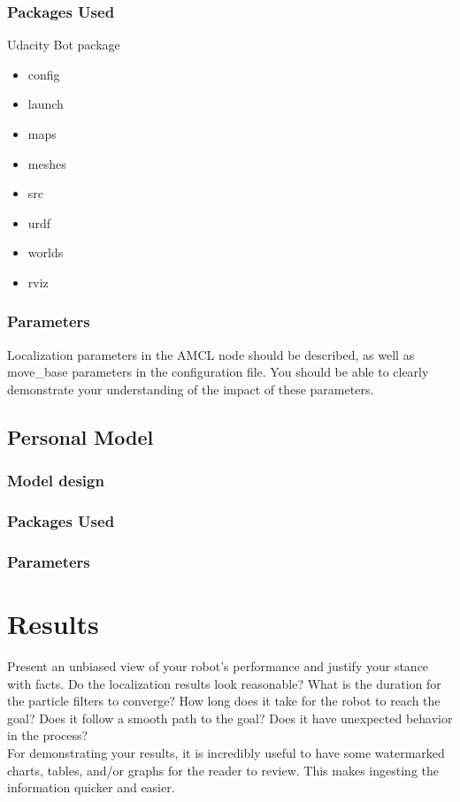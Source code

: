 \documentclass[10pt,journal,compsoc]{IEEEtran}
\begin{document}
\subsubsection{Packages Used}
Udacity Bot package
\begin{itemize}
\item config
\item launch
\item maps
\item meshes
\item src
\item urdf
\item worlds
\item rviz
\end {itemize}
\subsubsection{Parameters}
Localization parameters in the AMCL node should be described, as well as move\_base parameters in the configuration file. You should be able to clearly demonstrate your understanding of the impact of these parameters.

\subsection{Personal Model}
\subsubsection{Model design}
\subsubsection{Packages Used}
\subsubsection{Parameters}


\section{Results}
Present an unbiased view of your robot's performance and justify your stance with facts. Do the localization results look reasonable? What is the duration for the particle filters to converge? How long does it take for the robot to reach the goal? Does it follow a smooth path to the goal? Does it have unexpected behavior in the process? \\
For demonstrating your results, it is incredibly useful to have some watermarked charts, tables, and/or graphs for the reader to review. This makes ingesting the information quicker and easier.
\end{document}
